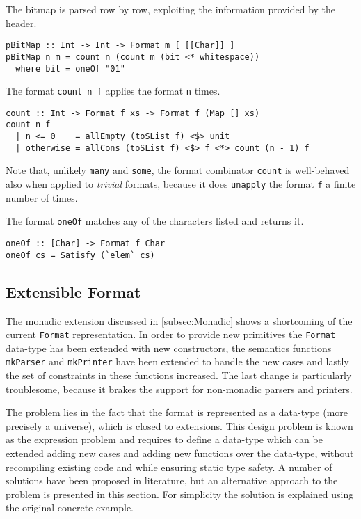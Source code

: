 \documentclass[../Thesis.tex]{subfiles}
\begin{document}
The bitmap is parsed row by row, exploiting the information provided by the header.
\begin{verbatim}
pBitMap :: Int -> Int -> Format m [ [[Char]] ]
pBitMap n m = count n (count m (bit <* whitespace))
  where bit = oneOf "01"
\end{verbatim}

The format \texttt{count n f} applies the format \texttt{n} times.
\begin{verbatim}
count :: Int -> Format f xs -> Format f (Map [] xs)
count n f
  | n <= 0    = allEmpty (toSList f) <$> unit
  | otherwise = allCons (toSList f) <$> f <*> count (n - 1) f
\end{verbatim}

Note that, unlikely \texttt{many} and \texttt{some}, the format combinator 
\texttt{count} is well-behaved also when applied to \emph{trivial} formats, 
because it does \texttt{unapply} the format \texttt{f} a finite number of times.

The format \texttt{oneOf} matches any of the characters listed and returns it.

\begin{verbatim}
oneOf :: [Char] -> Format f Char
oneOf cs = Satisfy (`elem` cs) 
\end{verbatim}

\subsection{Extensible Format}
The monadic extension discussed in \ref{subsec:Monadic} shows a shortcoming of the current \texttt{Format} representation.
In order to provide new primitives the \texttt{Format} data-type has been extended with new constructors, the semantics functions \texttt{mkParser} and \texttt{mkPrinter} have been extended to handle the new cases and lastly
the set of constraints in these functions increased.
The last change is particularly troublesome, because it brakes the support for non-monadic parsers and printers.

The problem lies in the fact that the format is represented as a data-type (more precisely a universe), which is closed to extensions.
This design problem is known as the expression problem \cite{Wadler98ExprPr} and requires to define a data-type which can be extended adding new cases and adding new functions over the data-type, without recompiling existing code and while ensuring static type safety.
A number of solutions have been proposed in literature, but an alternative approach to the problem is presented in this section.
For simplicity the solution is explained using the original concrete 
example.
\end{document}
